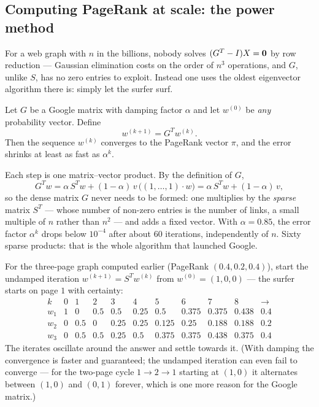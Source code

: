 \subsection{Computing PageRank at scale: the power method}

For a web graph with $n$ in the billions, nobody solves $(G^T - I)X = \mathbf{0}$ by row reduction — Gaussian
elimination costs on the order of $n^3$ operations, and $G$, unlike $S$, has no zero entries to exploit.
Instead one uses the oldest eigenvector algorithm there is: simply let the surfer surf.

\begin{fact}
Let $G$ be a Google matrix with damping factor $\alpha$ and let $w^{(0)}$ be \emph{any} probability
vector. Define
\[
w^{(k+1)} = G^T w^{(k)}.
\]
Then the sequence $w^{(k)}$ converges to the PageRank vector $\pi$, and the error shrinks at least as fast
as $\alpha^k$.
\end{fact}

\begin{remark}
Each step is one matrix--vector product. By the definition of $G$,
\[
G^T w = \alpha\, S^T w + (1-\alpha)\, v\, \big((1,\ldots,1) \cdot w\big) = \alpha\, S^T w + (1-\alpha)\, v,
\]
so the dense matrix $G$ never needs to be formed: one multiplies by the \emph{sparse} matrix $S^T$ — whose
number of non-zero entries is the number of links, a small multiple of $n$ rather than $n^2$ — and adds a
fixed vector. With $\alpha = 0.85$, the error factor $\alpha^{k}$ drops below $10^{-4}$ after about $60$
iterations, independently of $n$. Sixty sparse products: that is the whole algorithm that launched
Google.
\end{remark}

\begin{example}
For the three-page graph computed earlier (PageRank $(0.4, 0.2, 0.4)$), start the undamped iteration
$w^{(k+1)} = S^T w^{(k)}$ from $w^{(0)} = (1,0,0)$ — the surfer starts on page $1$ with certainty:
\[
\begin{array}{c|ccccccccc|c}
k & 0 & 1 & 2 & 3 & 4 & 5 & 6 & 7 & 8 & \to\\
\hline
w_1 & 1 & 0 & 0.5 & 0.5 & 0.25 & 0.5 & 0.375 & 0.375 & 0.438 & 0.4\\
w_2 & 0 & 0.5 & 0 & 0.25 & 0.25 & 0.125 & 0.25 & 0.188 & 0.188 & 0.2\\
w_3 & 0 & 0.5 & 0.5 & 0.25 & 0.5 & 0.375 & 0.375 & 0.438 & 0.375 & 0.4
\end{array}
\]
The iterates oscillate around the answer and settle towards it. (With damping the convergence is faster
and guaranteed; the undamped iteration can even fail to converge — for the two-page cycle $1\to 2\to 1$
starting at $(1,0)$ it alternates between $(1,0)$ and $(0,1)$ forever, which is one more reason for the
Google matrix.)
\end{example}

